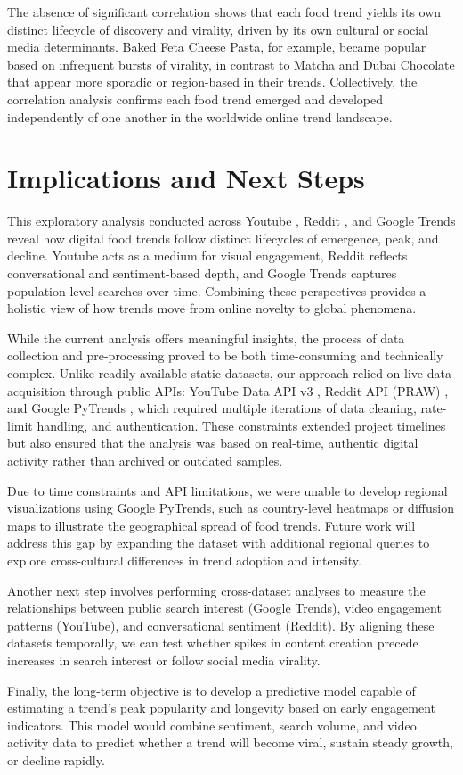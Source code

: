 \documentclass{article}
\begin{document}
The absence of significant correlation shows that each food trend yields its own distinct lifecycle of discovery and virality, driven by its own cultural or social media determinants. Baked Feta Cheese Pasta, for example, became popular based on infrequent bursts of virality, in contrast to Matcha and Dubai Chocolate that appear more sporadic or region-based in their trends. Collectively, the correlation analysis confirms each food trend emerged and developed independently of one another in the worldwide online trend landscape.

\newpage

\section{Implications and Next Steps}
This exploratory analysis conducted across Youtube \citep{youtube_api}, Reddit \citep{reddit_api_praw}, and Google Trends \citep{pytrends_api} reveal how digital food trends follow distinct lifecycles of emergence, peak, and decline. Youtube acts as a medium for visual engagement, Reddit reflects conversational and sentiment-based depth, and Google Trends captures population-level searches over time. Combining these perspectives provides a holistic view of how trends move from online novelty to global phenomena. 

While the current analysis offers meaningful insights, the process of data collection and pre-processing proved to be both time-consuming and technically complex. Unlike readily available static datasets, our approach relied on live data acquisition through public APIs: YouTube Data API v3 \citep{youtube_api}, Reddit API (PRAW) \citep{reddit_api_praw}, and Google PyTrends \citep{pytrends_api}, which required multiple iterations of data cleaning, rate-limit handling, and authentication. These constraints extended project timelines but also ensured that the analysis was based on real-time, authentic digital activity rather than archived or outdated samples.

Due to time constraints and API limitations, we were unable to develop regional visualizations using Google PyTrends, such as country-level heatmaps or diffusion maps to illustrate the geographical spread of food trends. Future work will address this gap by expanding the dataset with additional regional queries to explore cross-cultural differences in trend adoption and intensity.

Another next step involves performing cross-dataset analyses to measure the relationships between public search interest (Google Trends), video engagement patterns (YouTube), and conversational sentiment (Reddit). By aligning these datasets temporally, we can test whether spikes in content creation precede increases in search interest or follow social media virality.

Finally, the long-term objective is to develop a predictive model capable of estimating a trend’s peak popularity and longevity based on early engagement indicators. This model would combine sentiment, search volume, and video activity data to predict whether a trend will become viral, sustain steady growth, or decline rapidly.

\newpage

   
\end{document}
